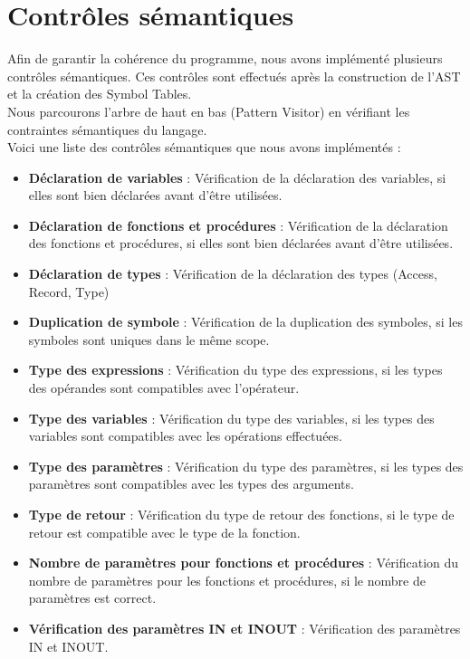 \documentclass[french,a4paper]{article}
\begin{document}
    \section{Contrôles sémantiques}

    Afin de garantir la cohérence du programme, nous avons implémenté plusieurs contrôles sémantiques. Ces contrôles sont effectués après la construction de l'AST et la création des Symbol Tables. \\

    Nous parcourons l'arbre de haut en bas (Pattern Visitor) en vérifiant les contraintes sémantiques du langage. \\

    Voici une liste des contrôles sémantiques que nous avons implémentés :
    \begin{itemize}
        \item \textbf{Déclaration de variables} : Vérification de la déclaration des variables, si elles sont bien déclarées avant d'être utilisées.
        \item \textbf{Déclaration de fonctions et procédures} : Vérification de la déclaration des fonctions et procédures, si elles sont bien déclarées avant d'être utilisées.
        \item \textbf{Déclaration de types} : Vérification de la déclaration des types (Access, Record, Type)
        \item \textbf{Duplication de symbole} : Vérification de la duplication des symboles, si les symboles sont uniques dans le même scope.
        \item \textbf{Type des expressions} : Vérification du type des expressions, si les types des opérandes sont compatibles avec l'opérateur.
        \item \textbf{Type des variables} : Vérification du type des variables, si les types des variables sont compatibles avec les opérations effectuées.
        \item \textbf{Type des paramètres} : Vérification du type des paramètres, si les types des paramètres sont compatibles avec les types des arguments.
        \item \textbf{Type de retour} : Vérification du type de retour des fonctions, si le type de retour est compatible avec le type de la fonction.
        \item \textbf{Nombre de paramètres pour fonctions et procédures} : Vérification du nombre de paramètres pour les fonctions et procédures, si le nombre de paramètres est correct.
        \item \textbf{Vérification des paramètres IN et INOUT} : Vérification des paramètres IN et INOUT.
    \end{itemize}
\end{document}
